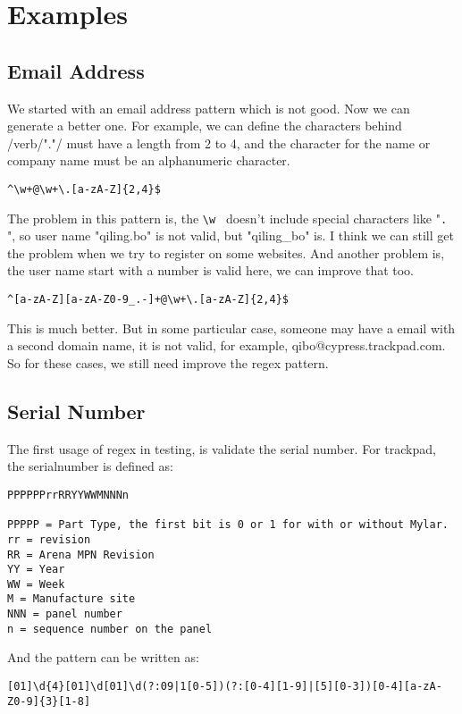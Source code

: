 \documentclass{article}
\begin{document}
\section{Examples}
\subsection{Email Address}
We started with an email address pattern which is not good. Now we can generate a better one. For example, we can define the characters behind /verb/"."/ must have a length from 2 to 4, and the character for the name or company name must be an alphanumeric character.
\begin{lstlisting}
^\w+@\w+\.[a-zA-Z]{2,4}$
\end{lstlisting}
The problem in this pattern is, the \verb/\w / doesn't include special characters like "\verb/. /", so user name "qiling.bo" is not valid, but "qiling\_bo" is. I think we can still get the problem when we try to register on some websites. And another problem is, the user name start with a number is valid here, we can improve that too.
\begin{lstlisting}
^[a-zA-Z][a-zA-Z0-9_.-]+@\w+\.[a-zA-Z]{2,4}$
\end{lstlisting}
This is much better. But in some particular case, someone may have a email with a second domain name, it is not valid, for example, qibo@cypress.trackpad.com. So for these cases, we still need improve the regex pattern.\\

\subsection{Serial Number}
The first usage of regex in testing, is validate the serial number. For trackpad, the serialnumber is defined as:

\begin{lstlisting}
PPPPPPrrRRYYWWMNNNn

PPPPP = Part Type, the first bit is 0 or 1 for with or without Mylar.
rr = revision
RR = Arena MPN Revision
YY = Year
WW = Week
M = Manufacture site
NNN = panel number
n = sequence number on the panel
\end{lstlisting}

And the pattern can be written as:
\begin{lstlisting}
[01]\d{4}[01]\d[01]\d(?:09|1[0-5])(?:[0-4][1-9]|[5][0-3])[0-4][a-zA-Z0-9]{3}[1-8]
\end{lstlisting}
\end{document}
